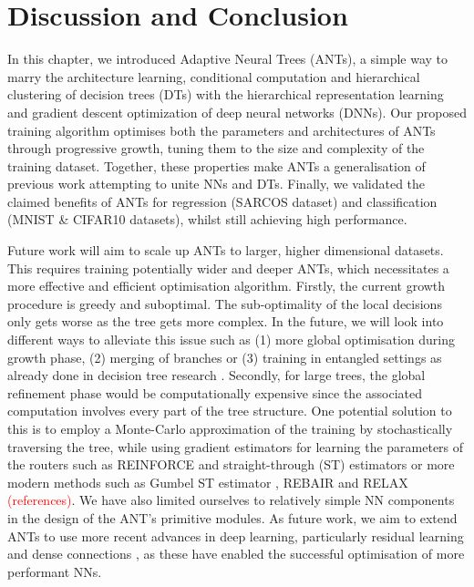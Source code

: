 
\section{Discussion and Conclusion}
In this chapter, we introduced Adaptive Neural Trees (ANTs), a simple way to marry the architecture learning, conditional computation and hierarchical clustering of decision trees (DTs) with the hierarchical representation learning and gradient descent optimization of deep neural networks (DNNs). Our proposed training algorithm optimises both the parameters and architectures of ANTs through progressive growth, tuning them to the size and complexity of the training dataset. Together, these properties make ANTs a generalisation of previous work attempting to unite NNs and DTs. Finally, we validated the claimed benefits of ANTs for regression (SARCOS dataset) and classification (MNIST \& CIFAR10 datasets), whilst still achieving high performance. 

Future work will aim to scale up ANTs to larger, higher dimensional datasets. This requires training potentially wider and deeper ANTs, which necessitates a more effective and efficient optimisation algorithm. Firstly, the current growth procedure is greedy and suboptimal. The sub-optimality of the local decisions only gets worse as the tree gets more complex. In the future, we will look into different ways to alleviate this issue such as (1)  more global optimisation during growth phase, (2) merging of branches \cite{shotton2013decision} or (3) training in entangled settings as already done in decision tree research \cite{montillo2011entangled}. Secondly, for large trees, the global refinement phase would be computationally expensive since the associated computation involves every part of the tree structure. One potential solution to this is to employ a Monte-Carlo approximation of the training by stochastically traversing the tree, while using gradient estimators for learning the parameters of the routers such as REINFORCE and straight-through (ST) estimators \cite{bengio2013} or more modern methods such as Gumbel ST estimator \cite{jang2016categorical}, REBAIR and RELAX \textcolor{red}{(references)}. We have also limited ourselves to relatively simple NN components in the design of the ANT's primitive modules. As future work, we aim to extend ANTs to use more recent advances in deep learning, particularly residual learning \cite{he2016deep} and dense connections \cite{huang2017densely}, as these have enabled the successful optimisation of more performant NNs. 

